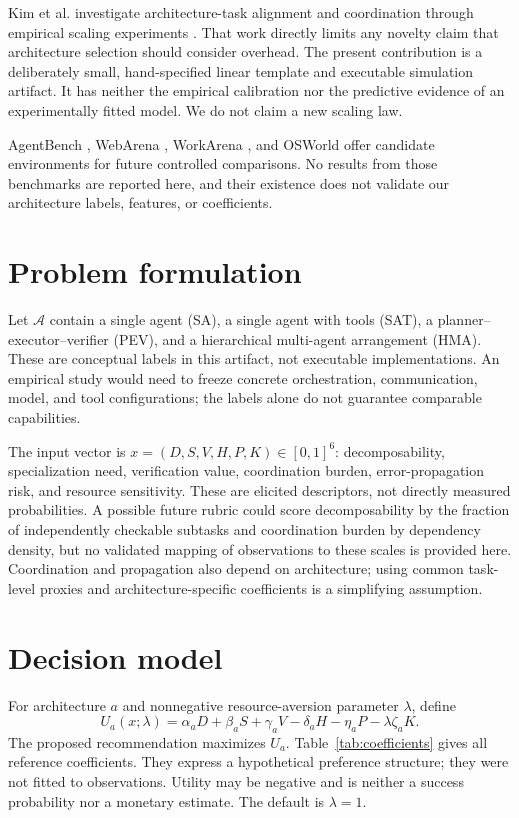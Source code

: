 \documentclass[11pt]{article}
\begin{document}
Kim et al. investigate architecture-task alignment and coordination through empirical scaling experiments \cite{kim2026scaling}. That work directly limits any novelty claim that architecture selection should consider overhead. The present contribution is a deliberately small, hand-specified linear template and executable simulation artifact. It has neither the empirical calibration nor the predictive evidence of an experimentally fitted model. We do not claim a new scaling law.

AgentBench \cite{liu2024agentbench}, WebArena \cite{zhou2024webarena}, WorkArena \cite{drouin2024workarena}, and OSWorld \cite{xie2024osworld} offer candidate environments for future controlled comparisons. No results from those benchmarks are reported here, and their existence does not validate our architecture labels, features, or coefficients.

\section{Problem formulation}
Let $\mathcal A$ contain a single agent (SA), a single agent with tools (SAT), a planner--executor--verifier (PEV), and a hierarchical multi-agent arrangement (HMA). These are conceptual labels in this artifact, not executable implementations. An empirical study would need to freeze concrete orchestration, communication, model, and tool configurations; the labels alone do not guarantee comparable capabilities.

The input vector is $x=(D,S,V,H,P,K)\in[0,1]^6$: decomposability, specialization need, verification value, coordination burden, error-propagation risk, and resource sensitivity. These are elicited descriptors, not directly measured probabilities. A possible future rubric could score decomposability by the fraction of independently checkable subtasks and coordination burden by dependency density, but no validated mapping of observations to these scales is provided here. Coordination and propagation also depend on architecture; using common task-level proxies and architecture-specific coefficients is a simplifying assumption.

\section{Decision model}
For architecture $a$ and nonnegative resource-aversion parameter $\lambda$, define
\begin{equation}\label{eq:utility}
U_a(x;\lambda)=\alpha_aD+\beta_aS+\gamma_aV-\delta_aH-\eta_aP-\lambda\zeta_aK.
\end{equation}
The proposed recommendation maximizes $U_a$. Table~\ref{tab:coefficients} gives all reference coefficients. They express a hypothetical preference structure; they were not fitted to observations. Utility may be negative and is neither a success probability nor a monetary estimate. The default is $\lambda=1$.
\end{document}
